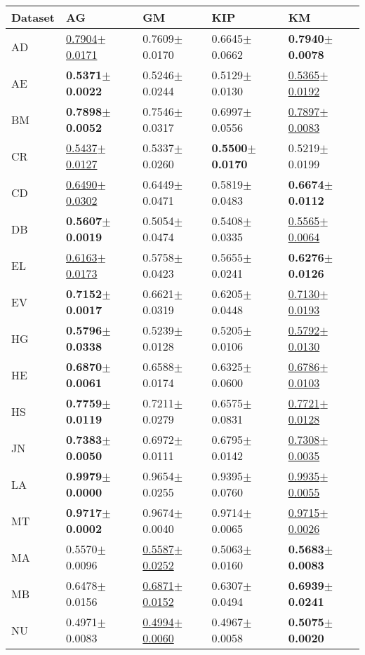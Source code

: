 \begin{tabular}{lllll}
\toprule
Dataset & AG & GM & KIP & KM \\
\midrule
AD & \underline{0.7904$\pm$0.0171} & 0.7609$\pm$0.0170 & 0.6645$\pm$0.0662 & \textbf{0.7940$\pm$0.0078} \\
AE & \textbf{0.5371$\pm$0.0022} & 0.5246$\pm$0.0244 & 0.5129$\pm$0.0130 & \underline{0.5365$\pm$0.0192} \\
BM & \textbf{0.7898$\pm$0.0052} & 0.7546$\pm$0.0317 & 0.6997$\pm$0.0556 & \underline{0.7897$\pm$0.0083} \\
CR & \underline{0.5437$\pm$0.0127} & 0.5337$\pm$0.0260 & \textbf{0.5500$\pm$0.0170} & 0.5219$\pm$0.0199 \\
CD & \underline{0.6490$\pm$0.0302} & 0.6449$\pm$0.0471 & 0.5819$\pm$0.0483 & \textbf{0.6674$\pm$0.0112} \\
DB & \textbf{0.5607$\pm$0.0019} & 0.5054$\pm$0.0474 & 0.5408$\pm$0.0335 & \underline{0.5565$\pm$0.0064} \\
EL & \underline{0.6163$\pm$0.0173} & 0.5758$\pm$0.0423 & 0.5655$\pm$0.0241 & \textbf{0.6276$\pm$0.0126} \\
EV & \textbf{0.7152$\pm$0.0017} & 0.6621$\pm$0.0319 & 0.6205$\pm$0.0448 & \underline{0.7130$\pm$0.0193} \\
HG & \textbf{0.5796$\pm$0.0338} & 0.5239$\pm$0.0128 & 0.5205$\pm$0.0106 & \underline{0.5792$\pm$0.0130} \\
HE & \textbf{0.6870$\pm$0.0061} & 0.6588$\pm$0.0174 & 0.6325$\pm$0.0600 & \underline{0.6786$\pm$0.0103} \\
HS & \textbf{0.7759$\pm$0.0119} & 0.7211$\pm$0.0279 & 0.6575$\pm$0.0831 & \underline{0.7721$\pm$0.0128} \\
JN & \textbf{0.7383$\pm$0.0050} & 0.6972$\pm$0.0111 & 0.6795$\pm$0.0142 & \underline{0.7308$\pm$0.0035} \\
LA & \textbf{0.9979$\pm$0.0000} & 0.9654$\pm$0.0255 & 0.9395$\pm$0.0760 & \underline{0.9935$\pm$0.0055} \\
MT & \textbf{0.9717$\pm$0.0002} & 0.9674$\pm$0.0040 & 0.9714$\pm$0.0065 & \underline{0.9715$\pm$0.0026} \\
MA & 0.5570$\pm$0.0096 & \underline{0.5587$\pm$0.0252} & 0.5063$\pm$0.0160 & \textbf{0.5683$\pm$0.0083} \\
MB & 0.6478$\pm$0.0156 & \underline{0.6871$\pm$0.0152} & 0.6307$\pm$0.0494 & \textbf{0.6939$\pm$0.0241} \\
NU & 0.4971$\pm$0.0083 & \underline{0.4994$\pm$0.0060} & 0.4967$\pm$0.0058 & \textbf{0.5075$\pm$0.0020} \\

\end{tabular}
